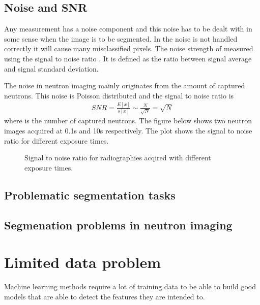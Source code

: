 \documentclass[letterpaper,10pt,english]{sphinxmanual}
\begin{document}
\noindent{}


\section{Noise and SNR}
\label{\detokenize{ML4NeutronImageSegmentation:noise-and-snr}}
Any measurement has a noise component and this noise has to be dealt with in some sense when the image is to be segmented. In the noise is not handled correctly it will cause many misclassified pixels. The noise strength of measured using the signal to noise ratio . It is defined as the ratio between signal average and signal standard deviation.

The noise in neutron imaging mainly originates from the amount of captured neutrons. This noise is Poisson distributed and the signal to noise ratio is
\begin{equation*}
\begin{split}SNR=\frac{E[x]}{s[x]}\sim\frac{N}{\sqrt{N}}=\sqrt{N}\end{split}
\end{equation*}
where  is the number of captured neutrons. The figure below shows two neutron images acquired at 0.1s and 10s respectively. The plot shows the signal to noise ratio for different exposure times.

\begin{figure}[htbp]
\centering
\capstart

\noindent{}
\caption{Signal to noise ratio for radiographies acqired with different exposure times.}\label{\detokenize{ML4NeutronImageSegmentation:id8}}\end{figure}




\section{Problematic segmentation tasks}
\label{\detokenize{ML4NeutronImageSegmentation:problematic-segmentation-tasks}}

\section{Segmenation problems in neutron imaging}
\label{\detokenize{ML4NeutronImageSegmentation:segmenation-problems-in-neutron-imaging}}

\chapter{Limited data problem}
\label{\detokenize{ML4NeutronImageSegmentation:limited-data-problem}}
Machine learning methods require a lot of training data to be able to build good models that are able to detect the features they are intended to.
\end{document}
